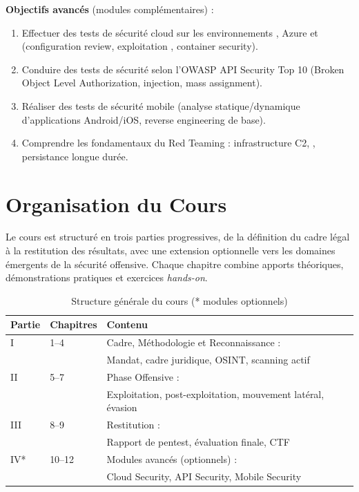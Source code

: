 \begin{boxobjectifs}
\textbf{Objectifs avancés} (modules complémentaires) :
\begin{enumerate}
    \item Effectuer des tests de sécurité cloud sur les environnements ,
          Azure et  (configuration review, exploitation ,
          container security).
    \item Conduire des tests de sécurité  selon l'OWASP API Security
          Top 10 (Broken Object Level Authorization, injection, mass assignment).
    \item Réaliser des tests de sécurité mobile (analyse statique/dynamique
          d'applications Android/iOS, reverse engineering de base).
    \item Comprendre les fondamentaux du Red Teaming : infrastructure C2,
          , persistance longue durée.
\end{enumerate}
\end{boxobjectifs}

\section*{Organisation du Cours}

Le cours est structuré en trois parties progressives, de la définition du cadre légal
à la restitution des résultats, avec une extension optionnelle vers les domaines
émergents de la sécurité offensive. Chaque chapitre combine apports théoriques,
démonstrations pratiques et exercices \textit{hands-on}.

\begin{table}[htbp]
\centering
\caption{Structure générale du cours (* modules optionnels)}
\label{tab:structure}
\begin{tabular}{lll}
\toprule
\textbf{Partie} & \textbf{Chapitres} & \textbf{Contenu} \\
\midrule
I  & 1--4 & Cadre, Méthodologie et Reconnaissance :\\
   &      & Mandat, cadre juridique, OSINT, scanning actif \\
\addlinespace
II & 5--7 & Phase Offensive :\\
   &      & Exploitation, post-exploitation, mouvement latéral, évasion \\
\addlinespace
III & 8--9 & Restitution :\\
    &      & Rapport de pentest, évaluation finale, CTF \\
\addlinespace
IV* & 10--12 & Modules avancés (optionnels) :\\
    &        & Cloud Security, API Security, Mobile Security \\
\bottomrule
\end{tabular}
\end{table}

